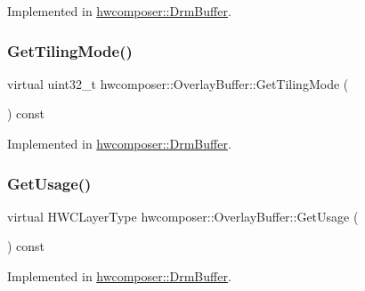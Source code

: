 Implemented in \mbox{\hyperlink{classhwcomposer_1_1DrmBuffer_a5844745322eb108eddb1e41eb1cf4f40}{hwcomposer\+::\+Drm\+Buffer}}.

\mbox{\label{classhwcomposer_1_1OverlayBuffer_a031e9b24c6dcbdd8a4ae6d842dac5db0}} 
\subsubsection{\texorpdfstring{Get\+Tiling\+Mode()}{GetTilingMode()}}
{\footnotesize\ttfamily virtual uint32\+\_\+t hwcomposer\+::\+Overlay\+Buffer\+::\+Get\+Tiling\+Mode (\begin{DoxyParamCaption}{ }\end{DoxyParamCaption}) const\hspace{0.3cm}{\ttfamily [pure virtual]}}



Implemented in \mbox{\hyperlink{classhwcomposer_1_1DrmBuffer_ae559626c3e3029ab95906bbc5c9319f7}{hwcomposer\+::\+Drm\+Buffer}}.

\mbox{\label{classhwcomposer_1_1OverlayBuffer_ab504f33fc91e6e49b1168331ff71b622}} 
\subsubsection{\texorpdfstring{Get\+Usage()}{GetUsage()}}
{\footnotesize\ttfamily virtual H\+W\+C\+Layer\+Type hwcomposer\+::\+Overlay\+Buffer\+::\+Get\+Usage (\begin{DoxyParamCaption}{ }\end{DoxyParamCaption}) const\hspace{0.3cm}{\ttfamily [pure virtual]}}



Implemented in \mbox{\hyperlink{classhwcomposer_1_1DrmBuffer_a41cb25d650c188e8be9ffa972776680b}{hwcomposer\+::\+Drm\+Buffer}}.

\mbox{\label{classhwcomposer_1_1OverlayBuffer_aa9d60e96c1b059944dfb952bbaf76f3b}} 
